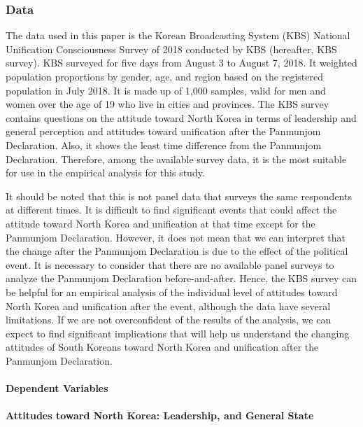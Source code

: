 \documentclass[letterpaper,9pt,twocolumn,twoside,]{pinp}
\begin{document}
\hypertarget{data}{%
\subsubsection{Data}\label{data}}

The data used in this paper is the Korean Broadcasting System (KBS)
National Unification Consciousness Survey of 2018 conducted by KBS
(hereafter, KBS survey). KBS surveyed for five days from August 3 to
August 7, 2018. It weighted population proportions by gender, age, and
region based on the registered population in July 2018. It is made up of
1,000 samples, valid for men and women over the age of 19 who live in
cities and provinces. The KBS survey contains questions on the attitude
toward North Korea in terms of leadership and general perception and
attitudes toward unification after the Panmunjom Declaration. Also, it
shows the least time difference from the Panmunjom Declaration.
Therefore, among the available survey data, it is the most suitable for
use in the empirical analysis for this study.

It should be noted that this is not panel data that surveys the same
respondents at different times. It is difficult to find significant
events that could affect the attitude toward North Korea and unification
at that time except for the Panmunjom Declaration. However, it does not
mean that we can interpret that the change after the Panmunjom
Declaration is due to the effect of the political event. It is necessary
to consider that there are no available panel surveys to analyze the
Panmunjom Declaration before-and-after. Hence, the KBS survey can be
helpful for an empirical analysis of the individual level of attitudes
toward North Korea and unification after the event, although the data
have several limitations. If we are not overconfident of the results of
the analysis, we can expect to find significant implications that will
help us understand the changing attitudes of South Koreans toward North
Korea and unification after the Panmunjom Declaration.

\hypertarget{dependent-variables}{%
\paragraph{Dependent Variables}\label{dependent-variables}}

\hypertarget{attitudes-toward-north-korea-leadership-and-general-state}{%
\paragraph{Attitudes toward North Korea: Leadership, and General
State}\label{attitudes-toward-north-korea-leadership-and-general-state}}
\end{document}
